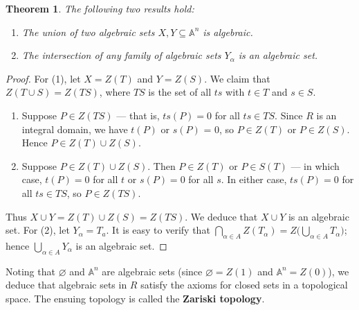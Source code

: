 \documentclass[11pt]{article}
\newtheorem{theorem}{Theorem}
\begin{document}
\begin{adjustwidth}{1cm}{}
  \begin{theorem}
    The following two results hold:
    \begin{enumerate}
      \item The union of two algebraic sets $X, Y \subseteq \mathbb{A}^{n}$ is algebraic.
      \item The intersection of any family of algebraic sets $Y_{\alpha}$ is an algebraic set.
    \end{enumerate}
  \end{theorem}
  \begin{proof}
    For (1), let $X = Z(T)$ and $Y = Z(S)$. We claim that $Z(T \cup S) = Z(TS)$, where $TS$ is the set of all $ts$ with $t \in T$ and $s \in S$.
    \begin{enumerate}
      \item Suppose $P \in Z(TS)$ --- that is, $ts(P) = 0$ for all $ts \in TS$. Since $R$ is an integral domain, we have $t(P)$ or $s(P)$ = 0, so $P \in Z(T)$ or $P \in Z(S)$. Hence $P \in Z(T) \cup Z(S)$.
      \item Suppose $P \in Z(T) \cup Z(S)$. Then $P \in Z(T)$ or $P \in S(T)$ --- in which case, $t(P) = 0$ for all $t$ or $s(P) = 0$ for all $s$. In either case, $ts(P) = 0$ for all $ts \in TS$, so $P \in Z(TS)$.
    \end{enumerate}
    Thus $X \cup Y = Z(T) \cup Z(S) = Z(TS)$. We deduce that $X \cup Y$ is an algebraic set. For (2), let $Y_{\alpha} = T_{a}$. It is easy to verify that $\bigcap_{\alpha \in A} Z(T_{\alpha}) = Z \big( \bigcup_{\alpha \in A} T_{\alpha} \big)$; hence $\bigcup_{\alpha \in A} Y_{\alpha}$ is an algebraic set.
  \end{proof}
\end{adjustwidth}

Noting that $\varnothing$ and $\mathbb{A}^{n}$ are algebraic sets (since $\varnothing = Z(1)$ and $\mathbb{A}^{n} = Z(0)$), we deduce that algebraic sets in $R$ satisfy the axioms for closed sets in a topological space. The ensuing topology is called the \textbf{Zariski topology}.

\end{document}

